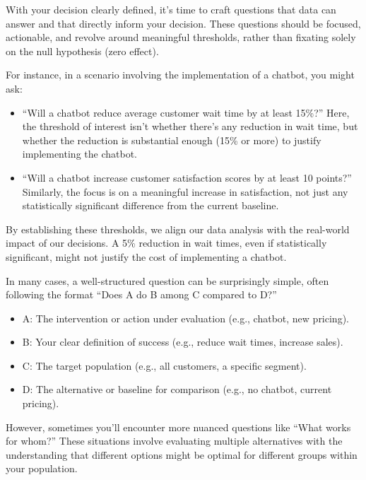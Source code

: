 \documentclass[
  letterpaper,
  DIV=11,
  numbers=noendperiod]{scrreprt}
\providecommand{\tightlist}{%
  \setlength{\itemsep}{0pt}\setlength{\parskip}{0pt}}\usepackage{longtable,booktabs,array}
\begin{document}
With your decision clearly defined, it's time to craft questions that
data can answer and that directly inform your decision. These questions
should be focused, actionable, and revolve around meaningful thresholds,
rather than fixating solely on the null hypothesis (zero effect).

For instance, in a scenario involving the implementation of a chatbot,
you might ask:

\begin{itemize}
\item
  ``Will a chatbot reduce average customer wait time by at least 15\%?''
  Here, the threshold of interest isn't whether there's any reduction in
  wait time, but whether the reduction is substantial enough (15\% or
  more) to justify implementing the chatbot.
\item
  ``Will a chatbot increase customer satisfaction scores by at least 10
  points?'' Similarly, the focus is on a meaningful increase in
  satisfaction, not just any statistically significant difference from
  the current baseline.
\end{itemize}

By establishing these thresholds, we align our data analysis with the
real-world impact of our decisions. A 5\% reduction in wait times, even
if statistically significant, might not justify the cost of implementing
a chatbot.

In many cases, a well-structured question can be surprisingly simple,
often following the format ``Does {A} do {B} among {C} compared to
{D}?''

\begin{itemize}
\tightlist
\item
  {A}: The intervention or action under evaluation (e.g., chatbot, new
  pricing).
\item
  {B}: Your clear definition of success (e.g., reduce wait times,
  increase sales).
\item
  {C}: The target population (e.g., all customers, a specific segment).
\item
  {D}: The alternative or baseline for comparison (e.g., no chatbot,
  current pricing).
\end{itemize}

However, sometimes you'll encounter more nuanced questions like ``What
works for whom?'' These situations involve evaluating multiple
alternatives with the understanding that different options might be
optimal for different groups within your population.
\end{document}
